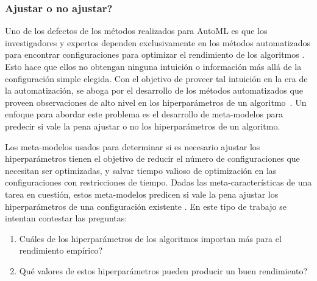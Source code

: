 \subsubsection{Ajustar o no ajustar?}


Uno de los defectos de los métodos realizados para AutoML es que los investigadores y expertos dependen exclusivamente en los métodos automatizados para encontrar configuraciones para optimizar el rendimiento de los algoritmos \cite{rijn2018hyp}. Esto hace que ellos no obtengan ninguna intuición o información más allá de la configuración simple elegida. Con el objetivo de proveer tal intuición en la era de la automatización, se aboga por el desarrollo de los métodos automatizados que proveen observaciones de alto nivel en los hiperparámetros de un algoritmo~\cite{vanschoren2018metalearning}. Un enfoque para abordar este problema es el desarrollo de meta-modelos para predecir si vale la pena ajustar o no los hiperparámetros de un algoritmo.

Los meta-modelos usados para determinar si es necesario ajustar los hiperparámetros tienen el objetivo de reducir el número de configuraciones que necesitan ser optimizadas, y salvar tiempo valioso de optimización en las configuraciones con restricciones de tiempo. Dadas las meta-características de una tarea en cuestión, estos meta-modelos predicen si vale la pena ajustar los hiperparámetros de una configuración existente \cite{ridd2014using, rijn2018hyp}. En este tipo de trabajo se intentan contestar las preguntas: 
\begin{enumerate}
	\item \textquestiondown Cuáles de los hiperparámetros de los algoritmos importan más para el rendimiento empírico?
	\item \textquestiondown Qué valores de estos hiperparámetros pueden producir un buen rendimiento?
\end{enumerate}

